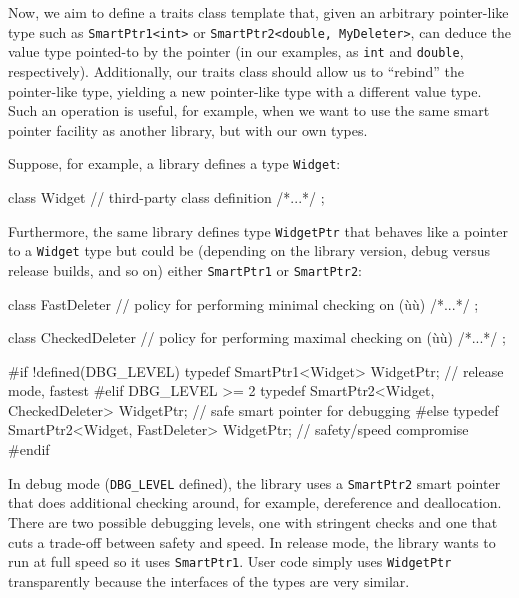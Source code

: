 Now, we aim to define a traits class template that, given an arbitrary
pointer-like type such as \lstinline!SmartPtr1<int>! or
\lstinline!SmartPtr2<double,!~\lstinline!MyDeleter>!, can deduce the value
type pointed-to by the pointer (in our examples, as \lstinline!int! and
\lstinline!double!, respectively). Additionally, our traits class should
allow us to ``rebind'' the pointer-like type, yielding a new
pointer-like type with a different value type. Such an operation is
useful, for example, when we want to use the same smart pointer facility
as another library, but with our own types.

Suppose, for example, a library defines a type \lstinline!Widget!:

\begin{emcppslisting}[emcppsbatch=e40]
class Widget           // third-party class definition
{ /*...*/ };
\end{emcppslisting}
    

\noindent Furthermore, the same library defines type \lstinline!WidgetPtr! that
behaves like a pointer to a \lstinline!Widget! type but could be (depending
on the library version, debug versus release builds, and so on) either
\lstinline!SmartPtr1! or \lstinline!SmartPtr2!:

\begin{emcppslisting}[emcppsbatch=e40]
class FastDeleter     // policy for performing minimal checking on (ù{}ù)
{ /*...*/ };

class CheckedDeleter        // policy for performing maximal checking on (ù{}ù)
{ /*...*/ };

#if !defined(DBG_LEVEL)
typedef SmartPtr1<Widget>
    WidgetPtr;                             // release mode, fastest
#elif DBG_LEVEL >= 2
typedef SmartPtr2<Widget, CheckedDeleter>
    WidgetPtr;                             // safe smart pointer for debugging
#else
typedef SmartPtr2<Widget, FastDeleter>
    WidgetPtr;                             // safety/speed compromise
#endif
\end{emcppslisting}
    

\noindent In debug mode (\lstinline!DBG_LEVEL! defined), the library uses a
\lstinline!SmartPtr2! smart pointer that does additional checking around,
for example, dereference and deallocation. There are two possible
debugging levels, one with stringent checks and one that cuts a
trade-off between safety and speed. In release mode, the library wants
to run at full speed so it uses \lstinline!SmartPtr1!. User code simply
uses \lstinline!WidgetPtr! transparently because the interfaces of the
types are very similar.

